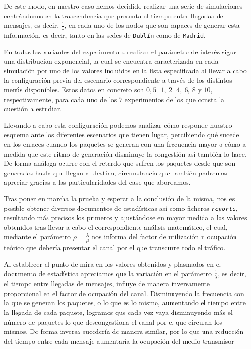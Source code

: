 \documentclass{article}[10pt]
\begin{document}
		De este modo, en nuestro caso hemos decidido realizar una serie de simulaciones centrándonos en la trascendencia que presenta el tiempo entre llegadas de mensajes, es decir, $\frac{1}{\lambda}$, en cada uno de los nodos que son capaces de generar esta información, es decir, tanto en las sedes de \texttt{Dublín} como de \texttt{Madrid}.

		En todas las variantes del experimento a realizar el parámetro de interés sigue una distribución exponencial, la cual se encuentra caracterizada en cada simulación por uno de los valores incluidos en la lista especificada al llevar a cabo la configuración previa del escenario correspondiente a través de los distintos menús disponibles. Estos datos en concreto son $0,5,\ 1,\ 2,\ 4,\ 6,\ 8$ y $10$, respectivamente, para cada uno de los $7$ experimentos de los que consta la cuestión a estudiar.

		Llevando a cabo esta configuración podemos analizar cómo responde nuestro esquema ante los diferentes escenarios que tienen lugar, percibiendo qué sucede en los enlaces cuando los paquetes se generan con una frecuencia mayor o cómo a medida que este ritmo de generación disminuye la congestión así también lo hace. De forma análoga ocurre con el retardo que sufren los paquetes desde que son generados hasta que llegan al destino, circunstancia que también podremos apreciar gracias a las particularidades del caso que abordamos.

		Tras poner en marcha la prueba y esperar a la conclusión de la misma, nos es posible obtener diversos documentos de estadísticas así como ficheros \texttt{\textit{reports}}, resultando más precisos los primeros y ajustándose en mayor medida a los valores obtenidos tras llevar a cabo el correspondiente análisis matemático, el cual, mediante el parámetro $\rho = \frac{\lambda}{\mu}$ nos informa del factor de utilización u ocupación teórico que debería presentar el canal por el que transcurre todo el tráfico.

		Al establecer el punto de mira en los valores obtenidos y plasmados en el documento de estadística apreciamos que la variación en el parámetro $\frac{1}{\lambda}$, es decir, el tiempo entre llegadas de mensajes, influye de manera inversamente proporcional en el factor de ocupación del canal. Disminuyendo la frecuencia con la que se generan los paquetes, o lo que es lo mismo, aumentando el tiempo entre la llegada de cada paquete, logramos que cada vez vaya disminuyendo más el número de paquetes lo que descongestiona el canal por el que circulan los mismos. De forma inversa sucedería de manera similar, por lo que una reducción del tiempo entre cada mensaje aumentaría la ocupación del medio transmisor.
\end{document}
